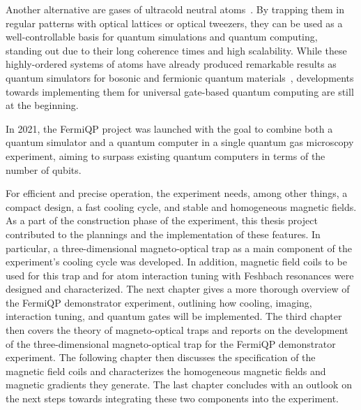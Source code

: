 Another alternative are gases of ultracold neutral atoms~\cite{deutsch_quantum_2000}. By trapping them in regular patterns with optical lattices or optical tweezers, they can be used as a well-controllable basis for quantum simulations and quantum computing, standing out due to their long coherence times and high scalability. While these highly-ordered systems of atoms have already produced remarkable results as quantum simulators for bosonic and fermionic quantum materials~\cite{bloch_quantum_2012, gross_quantum_2017}, developments towards implementing them for universal gate-based quantum computing are still at the beginning.

In 2021, the FermiQP project was launched with the goal to combine both a quantum simulator and a quantum computer in a single quantum gas microscopy experiment, aiming to surpass existing quantum computers in terms of the number of qubits.

For efficient and precise operation, the experiment needs, among other things, a compact design, a fast cooling cycle, and stable and homogeneous magnetic fields. As a part of the construction phase of the experiment, this thesis project contributed to the plannings and the implementation of these features. In particular, a three-dimensional magneto-optical trap as a main component of the experiment's cooling cycle was developed. In addition, magnetic field coils to be used for this trap and for atom interaction tuning with Feshbach resonances were designed and characterized. The next chapter gives a more thorough overview of the FermiQP demonstrator experiment, outlining how cooling, imaging, interaction tuning, and quantum gates will be implemented. The third chapter then covers the theory of magneto-optical traps and reports on the development of the three-dimensional magneto-optical trap for the FermiQP demonstrator experiment. The following chapter then discusses the specification of the magnetic field coils and characterizes the homogeneous magnetic fields and magnetic gradients they generate. The last chapter concludes with an outlook on the next steps towards integrating these two components into the experiment.


